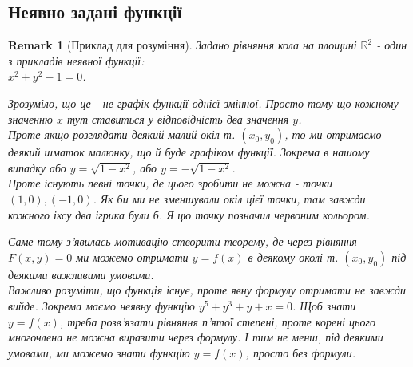 \documentclass[a4paper, 10pt]{article}
\theoremstyle{theoremdd}
\theoremstyle{theoremdd}
\theoremstyle{theoremdd}
\theoremstyle{theoremdd}
\theoremstyle{theoremdd}
\theoremstyle{theoremdd}
\newtheorem{remark}[theorem]{Remark}
\theoremstyle{theoremdd}
\theoremstyle{theoremdd}
\begin{document}
\subsection{Неявно задані функції}
\begin{remark}[Приклад для розуміння]
Задано рівняння кола на площині $\mathbb{R}^2$ - один з прикладів неявної функції:\\ $x^2+y^2-1=0$.
\begin{figure}[H]
\centering
{}
\end{figure}
Зрозуміло, що це - не графік функції однієї змінної. Просто тому що кожному значенню $x$ тут ставиться у відповідність два значення $y$.\\
Проте якщо розглядати деякий малий окіл т. $(x_0,y_0)$, то ми отримаємо деякий шматок малюнку, що й буде графіком функції. Зокрема в нашому випадку або $y = \sqrt{1-x^2}$, або $y = -\sqrt{1-x^2}$.\\
Проте існують певні точки, де цього зробити не можна - точки $(1,0),(-1,0)$. Як би ми не зменшували окіл цієї точки, там завжди кожного іксу два ігрика були б. Я цю точку позначил червоним кольором.
\begin{figure}[H]
\centering
{}
\end{figure}
Саме тому з'явилась мотивацію створити теорему, де через рівняння $F(x,y) = 0$ ми можемо отримати $y = f(x)$ в деякому околі т. $(x_0,y_0)$ під деякими важливими умовами.
\bigskip \\
Важливо розуміти, що функція існує, проте явну формулу отримати не завжди вийде. Зокрема маємо неявну функцію $y^5+y^3+y+x=0$. Щоб знати $y=f(x)$, треба розв'язати рівняння п'ятої степені, проте корені цього многочлена не можна виразити через формулу. І тим не менш, під деякими умовами, ми можемо знати функцію $y=f(x)$, просто без формули.
\end{remark}
\end{document}
